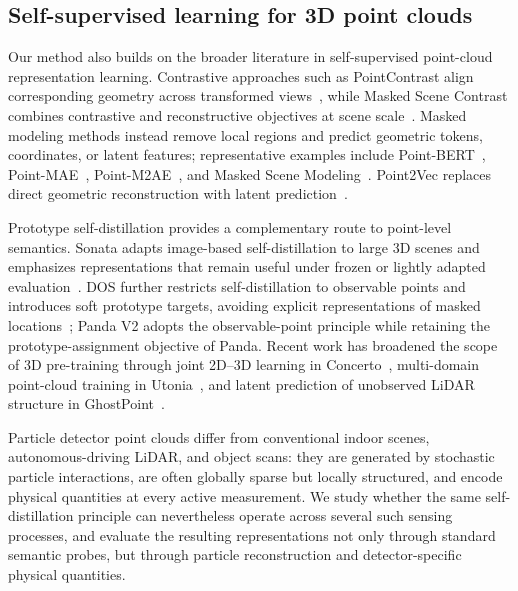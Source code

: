\subsection{Self-supervised learning for 3D point clouds}

Our method also builds on the broader literature in self-supervised point-cloud representation learning. Contrastive approaches such as PointContrast align corresponding geometry across transformed views~\citep{xie2020pointcontrastunsupervisedpretraining3d}, while Masked Scene Contrast combines contrastive and reconstructive objectives at scene scale~\citep{maskedscenecontrast}. Masked modeling methods instead remove local regions and predict geometric tokens, coordinates, or latent features; representative examples include Point-BERT~\citep{yu2022pointbertpretraining3dpoint}, Point-MAE~\citep{pang2022maskedautoencoderspointcloud}, Point-M2AE~\citep{zhang2022pointm2aemultiscalemaskedautoencoders}, and Masked Scene Modeling~\citep{hermosilla2025maskedscenemodeling}. Point2Vec replaces direct geometric reconstruction with latent prediction~\citep{zeid2023point2vecselfsupervisedrepresentationlearning}.

Prototype self-distillation provides a complementary route to point-level semantics. Sonata adapts image-based self-distillation to large 3D scenes and emphasizes representations that remain useful under frozen or lightly adapted evaluation~\citep{wu2025sonataselfsupervisedlearningreliable}. DOS further restricts self-distillation to observable points and introduces soft prototype targets, avoiding explicit representations of masked locations~\citep{dos}; Panda V2 adopts the observable-point principle while retaining the prototype-assignment objective of Panda. Recent work has broadened the scope of 3D pre-training through joint 2D--3D learning in Concerto~\citep{concerto}, multi-domain point-cloud training in Utonia~\citep{zhang2026utonia}, and latent prediction of unobserved LiDAR structure in GhostPoint~\citep{abdelsamad2026ghostpoint}.

Particle detector point clouds differ from conventional indoor scenes, autonomous-driving LiDAR, and object scans: they are generated by stochastic particle interactions, are often globally sparse but locally structured, and encode physical quantities at every active measurement. We study whether the same self-distillation principle can nevertheless operate across several such sensing processes, and evaluate the resulting representations not only through standard semantic probes, but through particle reconstruction and detector-specific physical quantities.

